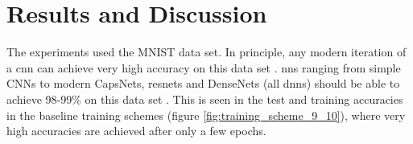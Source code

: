 \chapter{Results and Discussion}


The experiments used the MNIST data set. In principle, any modern iteration of a \gls{cnn} can achieve very high accuracy on this data set \cite{mnist_sota_web}. \gls{nn}s ranging from simple CNNs to modern CapsNets, \gls{resnet}s and DenseNets (all \gls{dnn}s) should be able to achieve 98-99\% on this data set {\cite{mnist_sota_web}}. This is seen in the test and training accuracies in the baseline training schemes (figure \ref{fig:training_scheme_9_10}), where very high accuracies are achieved after only a few \gls{epoch}s. 
\bigskip




